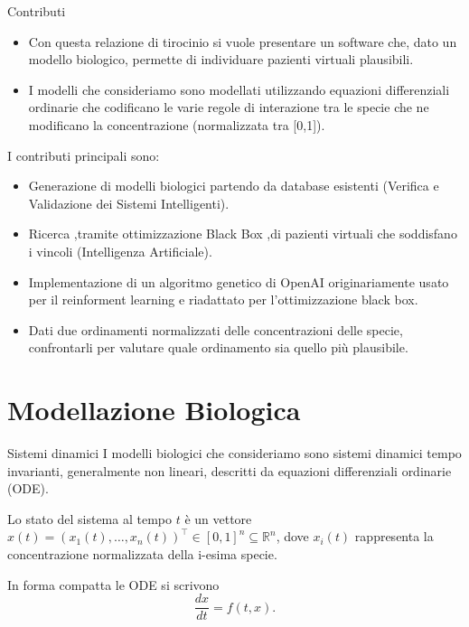 \documentclass{beamer}
\begin{document}
\begin{frame}[fragile]{Contributi}

\begin{itemize}
    \item Con questa relazione di tirocinio si vuole presentare un software che, dato un
modello biologico, permette di individuare pazienti virtuali plausibili.
    \item I modelli che consideriamo sono modellati utilizzando equazioni differenziali ordinarie che codificano
    le varie regole di interazione tra le specie che ne modificano la concentrazione (normalizzata tra [0,1]).
\end{itemize}

I contributi principali sono:

\begin{itemize}
    \item Generazione di modelli biologici partendo da database esistenti (Verifica e Validazione dei Sistemi Intelligenti).
    \item Ricerca ,tramite ottimizzazione Black Box ,di pazienti virtuali che soddisfano i vincoli (Intelligenza Artificiale).
    \item Implementazione di un algoritmo genetico di OpenAI originariamente usato
per il reinforment learning e riadattato per l'ottimizzazione black box.
    \item Dati due ordinamenti normalizzati delle concentrazioni delle
    specie, confrontarli per valutare quale ordinamento sia quello più plausibile.
\end{itemize}

\end{frame}


\section{Modellazione Biologica}

\begin{frame}[fragile]{Sistemi dinamici}
I modelli biologici che consideriamo sono sistemi dinamici tempo invarianti, generalmente non lineari, descritti da equazioni differenziali ordinarie (ODE).

Lo stato del sistema al tempo \(t\) è un vettore \(x(t) = (x_1(t),\dots,x_n(t))^\top \in [0,1]^n \subseteq \mathbb{R}^n\), dove \(x_i(t)\) rappresenta la concentrazione normalizzata della i-esima specie.

In forma compatta le ODE si scrivono
\[
\frac{dx}{dt} = f(t,x).
\]
\end{frame}
\end{document}

